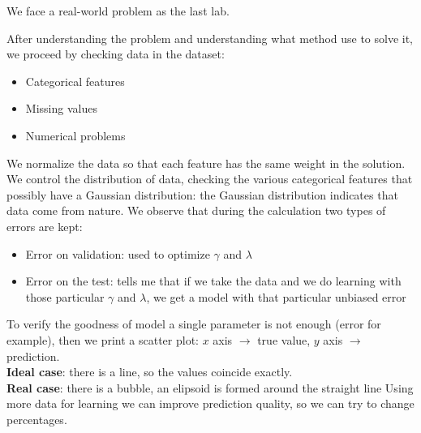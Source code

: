 We face a real-world problem as the last lab.

After understanding the problem and understanding what method use to solve it, we proceed by checking data in the dataset:
\begin{itemize}
	
	\item Categorical features
	\item Missing values
	\item Numerical problems
	
\end{itemize}
We normalize the data so that each feature has the same weight in the solution.
We control the distribution of data, checking the various categorical features that possibly have a Gaussian distribution: the Gaussian distribution indicates that data come from nature.
We observe that during the calculation two types of errors are kept:
\begin{itemize}
	
	\item Error on validation: used to optimize $\gamma$ and $\lambda$
	\item Error on the test: tells me that if we take the data and we do learning with those particular $\gamma$ and $\lambda$, we get a model with that particular unbiased error

	
\end{itemize}
To verify the goodness of model a single parameter is not enough (error for example), then we print a scatter plot: $x$ axis $\rightarrow$ true value, $y$ axis $\rightarrow$ prediction.\\
\textbf{Ideal case}: there is a line, so the values coincide exactly.\\
\textbf{Real case}: there is a bubble, an elipsoid is formed around the straight line
Using more data for learning we can improve prediction quality, so we can try to change percentages.


